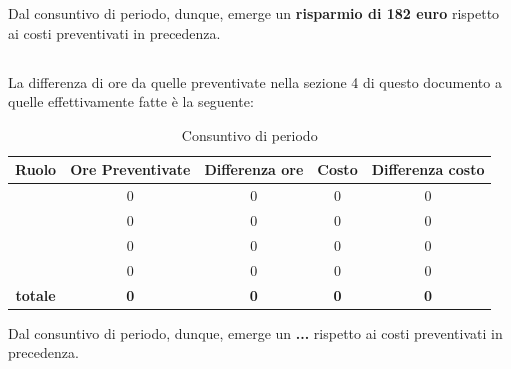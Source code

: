 Dal consuntivo di periodo, dunque, emerge un \textbf{risparmio di 182 euro} rispetto ai costi preventivati in precedenza.

\newpage

\subsection{\COD}
La differenza di ore da quelle preventivate nella sezione 4 di questo documento a quelle effettivamente fatte è la seguente:

\begin{table}[h]
	\begin{center}
		\begin{tabular}{|c|c|c|c|c|}
			\hline
			\textbf{Ruolo}	& \textbf{Ore Preventivate} & \textbf{Differenza ore} & \textbf{Costo} & \textbf{Differenza costo}\\
			\hline
			\Pm &	0  & 0 &	0 & 0\\
			\hline
			\Am	&	0 & 0 & 0 & 0\\
			\hline
			\Prog	&	0 & 0 & 0 & 0 \\
			\hline
			\Ver &	0 & 0 & 0 & 0\\
			\hline
			\textbf{totale}	&	\textbf{0} & \textbf{0} & \textbf{0} & \textbf{0} \\
			\hline
		\end{tabular}
	\end{center}
	\caption{Consuntivo di periodo \COD}
\end{table}

Dal consuntivo di periodo, dunque, emerge un \textbf{...} rispetto ai costi preventivati in precedenza.
